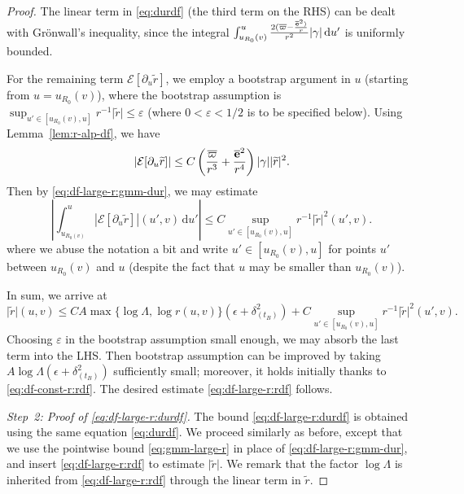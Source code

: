 \documentclass[10pt, reqno]{amsart}
\theoremstyle{definition}
\theoremstyle{remark}
\theoremstyle{conjecture}
\numberwithin{equation}{section}
\newcommand{\abs}[1]{\vert#1\vert}
\newcommand{\set}[1]{\{#1\}}
\newcommand{\ud}{\mathrm{d}}
\newcommand{\rd}{\partial}
\newcommand{\0}{\emptyset}
\newcommand{\gmm}{\gamma}
\newcommand{\dlt}{\delta}
\newcommand{\eps}{\epsilon}
\newcommand{\veps}{\varepsilon}
\newcommand{\Lmb}{\Lambda}
\newcommand{\bfe}{{\bf e}}
\newcommand{\calE}{\mathcal E}
\newcommand{\pfstep}[1]{\vspace{.5em} {\it \noindent #1.}}
\newcommand{\e}{\bfe}							%
\newcommand{\rbg}{\overline{r}}					%
\newcommand{\varpibg}{\overline{\varpi}}				%
\newcommand{\ebg}{\overline{\e}}					%
\newcommand{\rdf}{\widetilde{r}}					%
\newcommand{\Abs}[1]{\left\vert #1 \right\vert}
\begin{document}
\begin{proof}
The linear term in \eqref{eq:durdf} (the third term on the RHS) can be dealt with Gr\"onwall's inequality, since the integral $\int_{u_{R_{0}}(v)}^{u} \frac{2 (\varpibg - \frac{\ebg^{2})}{r}}{r^{2}} \abs{\gmm} \, \ud u'$ is uniformly bounded. 

For the remaining term $\calE [\rd_{u} \rdf]$, we employ a bootstrap argument in $u$ (starting from $u = u_{R_{0}}(v)$), where the bootstrap assumption is $ \sup_{u' \in [u_{R_{0}}(v), u]} r^{-1}\abs{\rdf} \leq \veps$ (where $0 < \veps < 1/2$ is to be specified below).
Using Lemma~\ref{lem:r-alp-df}, we have
\begin{equation}\label{eq:durdf-err}
	\Abs{\calE[\rd_{u} \rdf]} \leq C \left( \frac{\varpibg}{r^{3}} + \frac{\ebg^{2}}{r^{4}} \right) \abs{\gmm} \abs{\rdf}^{2}.
\end{equation}
Then by \eqref{eq:df-large-r:gmm-dur}, we may estimate
\begin{equation*}
	\Abs{\int_{u_{R_{0}(v)}}^{u} \Abs{\calE[\rd_{u} \rdf]}(u', v)  \, \ud u'} \leq C \sup_{u' \in [u_{R_{0}}(v), u]} r^{-1} \abs{\rdf}^{2}(u',v).
\end{equation*}
where we abuse the notation a bit and write $u' \in [u_{R_{0}}(v), u]$ for points $u'$ between $u_{R_{0}}(v)$ and $u$ (despite the fact that $u$ may be smaller than $u_{R_{0}}(v)$).

In sum, we arrive at
\begin{equation*}
	\abs{\rdf}(u, v) \leq C A \max \set{\log \Lmb, \log r(u, v)} \left( \eps + \dlt_{(t_{B})}^{2} \right) + C \sup_{u' \in [u_{R_{0}}(v), u]} r^{-1}\abs{\rdf}^{2}(u',v).
\end{equation*}
Choosing $\veps$ in the bootstrap assumption small enough, we may absorb the last term into the LHS. Then bootstrap assumption can be improved by taking $A \log \Lmb (\eps+ \dlt_{(t_{B})}^{2})$ sufficiently small; moreover, it holds initially thanks to \eqref{eq:df-const-r:rdf}. The desired estimate \eqref{eq:df-large-r:rdf} follows.

\pfstep{Step~2: Proof of \eqref{eq:df-large-r:durdf}}
The bound \eqref{eq:df-large-r:durdf} is obtained using the same equation \eqref{eq:durdf}. We proceed similarly as before, except that we use the pointwise bound \eqref{eq:gmm-large-r} in place of \eqref{eq:df-large-r:gmm-dur}, and insert \eqref{eq:df-large-r:rdf} to estimate $\abs{\rdf}$. We remark that the factor $\log \Lmb$ is inherited from \eqref{eq:df-large-r:rdf} through the linear term in $\rdf$. 


\end{proof}
\end{document}
